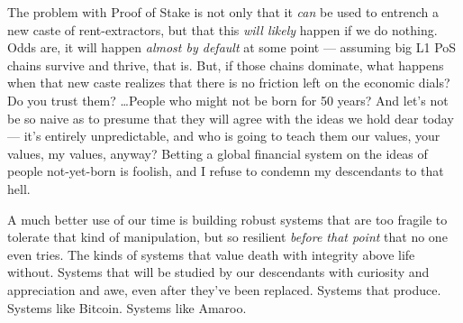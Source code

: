 The problem with Proof of Stake is not only that it \emph{can} be used to entrench a new caste of rent-extractors, but that this \emph{will likely} happen if we do nothing.
Odds are, it will happen \emph{almost by default} at some point --- assuming big L1 PoS chains survive and thrive, that is.
But, if those chains dominate, what happens when that new caste realizes that there is no friction left on the economic dials?
Do you trust them?
\ldots People who might not be born for 50 years?
And let's not be so naive as to presume that they will agree with the ideas we hold dear today --- it's entirely unpredictable, and who is going to teach them our values, your values, my values, anyway?
Betting a global financial system on the ideas of people not-yet-born is foolish, and I refuse to condemn my descendants to that hell.

A much better use of our time is building robust systems that are too fragile to tolerate that kind of manipulation, but so resilient \emph{before that point} that no one even tries.
The kinds of systems that value death with integrity above life without.
Systems that will be studied by our descendants with curiosity and appreciation and awe, even after they've been replaced.\newline
Systems that produce.\newline
Systems like Bitcoin.\newline
Systems like Amaroo.
